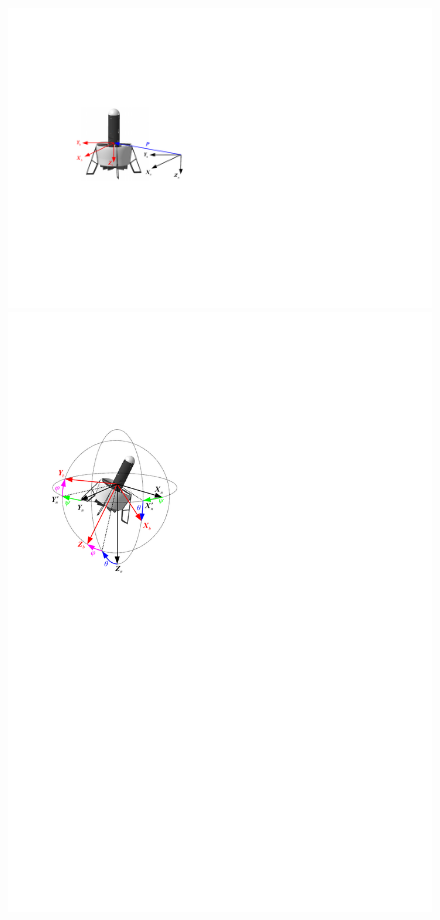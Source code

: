 \begin{figure}[htbp]
	\centering
	\begin{minipage}[c]{0.5\textwidth}
		\centering
		\includegraphics[scale=1]{Fig/Fig_NED_B.pdf}
	\end{minipage}%
	\begin{minipage}[c]{0.5\textwidth}
		\centering
		\includegraphics[scale=1]{Fig/Fig_euler.pdf}

\end{minipage}
\end{figure}
